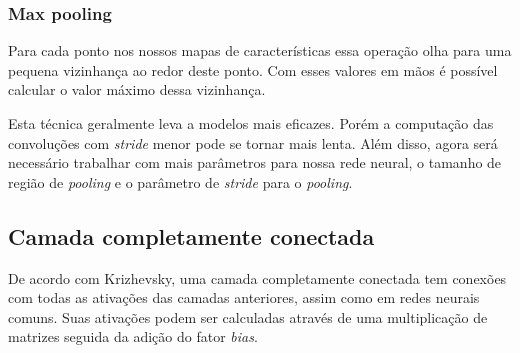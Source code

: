 \subsubsection{Max pooling}

Para cada ponto nos nossos mapas de características essa operação
olha para uma pequena vizinhança ao redor deste ponto. Com esses
valores em mãos é possível calcular o valor máximo dessa vizinhança.

Esta técnica geralmente leva a modelos mais eficazes. Porém a
computação das convoluções com \textit{stride} menor pode se tornar mais
lenta. Além disso, agora será necessário trabalhar com mais parâmetros
para nossa rede neural, o tamanho de região de \textit{pooling} e o
parâmetro de \textit{stride} para o \textit{pooling}.

\subsection{Camada completamente conectada}

De acordo com Krizhevsky\cite{Krizhevsky}, uma camada completamente
conectada tem conexões com todas as ativações das camadas anteriores,
assim como em redes neurais comuns. Suas ativações podem ser
calculadas através de uma multiplicação de matrizes seguida da adição
do fator \textit{bias}.